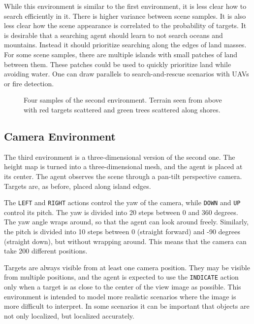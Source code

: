 While this environment is similar to the first environment, it is less clear how to search efficiently in it.
There is higher variance between scene samples.
It is also less clear how the scene appearance is correlated to the probability of targets.
It is desirable that a searching agent should learn to not search oceans and mountains.
Instead it should prioritize searching along the edges of land masses.
For some scene samples, there are multiple islands with small patches of land between them.
These patches could be used to quickly prioritize land while avoiding water.
One can draw parallels to search-and-rescue scenarios with UAVs or fire detection.

\begin{figure}
    \centering
    
    \label{fig:terrain}
    \caption[Terrain environment]{Four samples of the second environment. Terrain seen from above with red targets scattered and green trees scattered along shores.}
\end{figure}

\subsection{Camera Environment}

The third environment is a three-dimensional version of the second one.
The height map is turned into a three-dimensional mesh, and the agent is placed at its center.
The agent observes the scene through a pan-tilt perspective camera.
Targets are, as before, placed along island edges.

The \texttt{LEFT} and \texttt{RIGHT} actions control the yaw of the camera, while \texttt{DOWN} and \texttt{UP} control its pitch.
The yaw is divided into 20 steps between 0 and 360 degrees.
The yaw angle wraps around, so that the agent can look around freely.
Similarly, the pitch is divided into 10 steps between 0 (straight forward) and -90 degrees (straight down), but without wrapping around.
This means that the camera can take 200 different positions.

Targets are always visible from at least one camera position.
They may be visible from multiple positions, and the agent is expected to use the \texttt{INDICATE} action only when a target is as close to the center of the view image as possible.
This environment is intended to model more realistic scenarios where the image is more difficult to interpret.
In some scenarios it can be important that objects are not only localized, but localized accurately.

